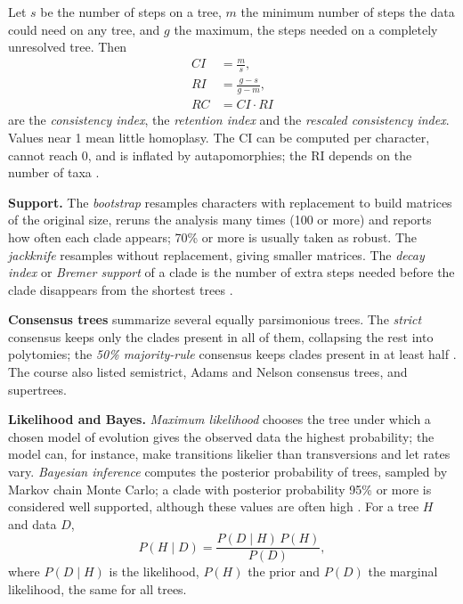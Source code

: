Let $s$ be the number of steps on a tree,
$m$ the minimum number of steps the data
could need on any tree, and $g$ the
maximum, the steps needed on a completely
unresolved tree. Then
\begin{equation}
\label{equation-ci-ri}
\begin{aligned}
CI &= \frac{m}{s}, \\
RI &= \frac{g-s}{g-m}, \\
RC &= CI \cdot RI
\end{aligned}
\end{equation}
are the \emph{consistency index}, the
\emph{retention index} and the
\emph{rescaled consistency index}. Values
near 1 mean little homoplasy. The CI can
be computed per character, cannot reach 0,
and is inflated by autapomorphies; the RI
depends on the number of taxa
\cite[Chapter 2]{simpson2006plant}.

\textbf{Support.} The \emph{bootstrap}
resamples characters with replacement to
build matrices of the original size,
reruns the analysis many times (100 or
more) and reports how often each clade
appears; 70\% or more is usually taken as
robust. The \emph{jackknife} resamples
without replacement, giving smaller
matrices. The \emph{decay index} or
\emph{Bremer support} of a clade is the
number of extra steps needed before the
clade disappears from the shortest trees
\cite[Chapter 2]{simpson2006plant}.

\textbf{Consensus trees} summarize several
equally parsimonious trees. The
\emph{strict} consensus keeps only the
clades present in all of them, collapsing
the rest into polytomies; the \emph{50\%
majority-rule} consensus keeps clades
present in at least half
\cite[Chapter 2]{simpson2006plant}. The
course also listed semistrict, Adams and
Nelson consensus trees, and supertrees.

\textbf{Likelihood and Bayes.}
\emph{Maximum likelihood} chooses the tree
under which a chosen model of evolution
gives the observed data the highest
probability; the model can, for instance,
make transitions likelier than
transversions and let rates vary.
\emph{Bayesian inference} computes the
posterior probability of trees, sampled by
Markov chain Monte Carlo; a clade with
posterior probability 95\% or more is
considered well supported, although these
values are often high
\cite[Chapter 2]{simpson2006plant}. For a
tree $H$ and data $D$,
$$
P(H \mid D) =
\frac{P(D \mid H)\, P(H)}{P(D)},
$$
where $P(D \mid H)$ is the likelihood,
$P(H)$ the prior and $P(D)$ the marginal
likelihood, the same for all trees.


